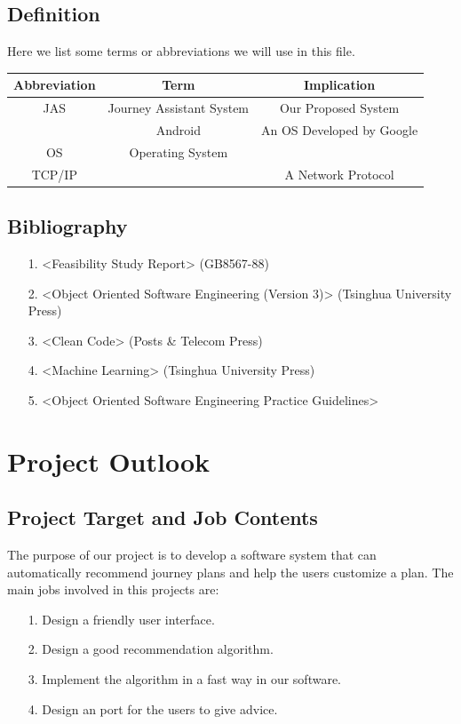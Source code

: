\documentclass[10pt]{article}
\begin{document}
\subsection{Definition}
Here we list some terms or abbreviations we will use in this file.

\begin{center}
\begin{tabular}{|c|c|c|} 
	\hline 
	Abbreviation&Term&Implication\\
	\hline  
	JAS&Journey Assistant System&Our Proposed System\\
	\hline 
	 &Android&An OS Developed by Google\\
	\hline
	OS&Operating System& \\
	\hline
	TCP/IP& &A Network Protocol\\
	\hline
\end{tabular}    
\end{center}

\subsection{Bibliography}
\begin{itemize}
	\item[1.] <Feasibility Study Report> (GB8567-88)
	\item[2.] <Object Oriented Software Engineering (Version 3)> (Tsinghua University Press)
	\item[3.] <Clean Code> (Posts \& Telecom Press)
	\item[4.] <Machine Learning> (Tsinghua University Press)
	\item[5.] <Object Oriented Software Engineering Practice Guidelines> 
\end{itemize}

\section{Project Outlook}
\subsection{Project Target and Job Contents}
The purpose of our project is to develop a software system that can automatically recommend journey plans and help the users customize a plan. The main jobs involved in this projects are:

\begin{itemize}
	\item[1.] Design a friendly user interface.
	\item[2.] Design a good recommendation algorithm.
	\item[3.] Implement the algorithm in a fast way in our software.
	\item[4.] Design an port for the users to give advice.
\end{itemize}
\end{document}
